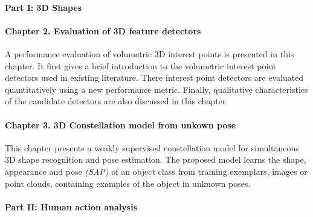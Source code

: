 \paragraph{Part I: 3D Shapes}


\paragraph{Chapter 2. Evaluation of 3D feature detectors} 
A performance evaluation of volumetric 3D interest points is presented in this chapter. 
It first gives a brief introduction to the volumetric interest point detectors used in existing literature.
There interest point detectors are evaluated quantitatively using a new performance metric.
Finally, qualitative characteristics of the candidate detectors are also discussed in this chapter. 

\paragraph{Chapter 3. 3D Constellation model from unkown pose}
This chapter presents a weakly supervised constellation model for simultaneous 3D shape recognition and pose estimation. 
The proposed model learns the shape, appearance and pose \emph{(SAP)} of an object class from training exemplars, \eg images or point clouds, containing examples of the object in unknown poses.  

\paragraph{Part II: Human action analysis}


